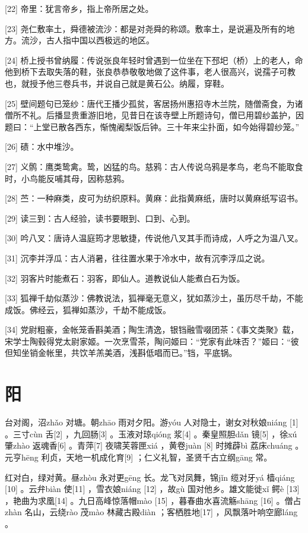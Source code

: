 \documentclass[12pt,UTF8]{ctexbook}
\begin{document}
[22] 帝里：犹言帝乡，指上帝所居之处。

[23] 尧仁敷率土，舜德被流沙：都是对尧舜的称颂。敷率土，是说遍及所有的地方。流沙，古人指中国以西极远的地区。

[24] 桥上授书曾纳履：传说张良年轻时曾遇到一位坐在下邳圯（桥）上的老人，命他到桥下去取失落的鞋，张良恭恭敬敬地做了这件事，老人很高兴，说孺子可教也，就授予他三卷兵书，并说自己就是黄石公。纳履，穿鞋。

[25] 壁间题句已笼纱：唐代王播少孤贫，客居扬州惠招寺木兰院，随僧斋食，为诸僧所不礼。后播显贵重游旧地，见昔日在该寺壁上所题诗句，僧已用碧纱盖护，因题曰：“上堂已散各西东，惭愧阇梨饭后钟。三十年来尘扑面，如今始得碧纱笼。”

[26] 碛：水中堆沙。

[27] 义鹘：鹰类鸷禽。鸷，凶猛的鸟。慈鸦：古人传说乌鸦是孝鸟，老鸟不能取食时，小鸟能反哺其母，因称慈鸦。

[28] 苎：一种麻类，皮可为纺织原料。黄麻：此指黄麻纸，唐时以黄麻纸写诏书。

[29] 读三到：古人经验，读书要眼到、口到、心到。

[30] 吟八叉：唐诗人温庭筠才思敏捷，传说他八叉其手而诗成，人呼之为温八叉。

[31] 沉李并浮瓜：古人消暑，往往置水果于冷水中，故有沉李浮瓜之说。

[32] 羽客片时能煮石：羽客，即仙人。道教说仙人能煮白石为饭。

[33] 狐禅千劫似蒸沙：佛教说法，狐禅毫无意义，犹如蒸沙土，虽历尽千劫，不能成饭。佛经云，狐禅如蒸沙，千劫不能成饭。

[34] 党尉粗豪，金帐笼香斟美酒；陶生清逸，银铛融雪啜团茶：《事文类聚》载，宋学士陶毂得党太尉家姬。一次烹雪茶，陶问姬曰：“党家有此味否？”姬曰：“彼但知坐销金帐里，共饮羊羔美酒，浅斟低唱而已。”铛，平底锅。





\chapter{阳}


台对阁，沼zhǎo 对塘。朝zhāo 雨对夕阳。游yóu 人对隐士，谢女对秋娘niáng [1] 。三寸cùn 舌[2] ，九回肠[3] 。玉液对琼qióng 浆[4] 。秦皇照胆dǎn 镜[5] ，徐xú 肇zhào 返魂香[6] 。青萍[7] 夜啸芙蓉匣xiá ，黄卷juàn [8] 时摊薜bì 荔床chuáng 。元亨hēng 利贞，天地一机成化育[9] ；仁义礼智，圣贤千古立纲gāng 常。

红对白，绿对黄。昼zhòu 永对更gēng 长。龙飞对凤舞，锦jǐn 缆对牙yá 樯qiáng [10] 。云弁biàn 使[11] ，雪衣娘niáng [12] ，故gù 国对他乡。雄文能徙xǐ 鳄è [13] ，艳曲为求凰[14] 。九日高峰惊落帽mào [15] ，暮春曲水喜流觞shāng [16] 。僧占zhàn 名山，云绕rào 茂mào 林藏古殿diàn ；客栖胜地[17] ，风飘落叶响空廊láng 。
\end{document}

